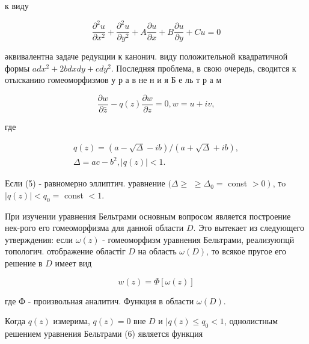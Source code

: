 \documentclass[10pt]{article}
\begin{document}
к виду



\[

\frac{\partial^{2} u}{\partial x^{2}}+\frac{\partial^{2} u}{\partial y^{2}}+A \frac{\partial u}{\partial x}+B \frac{\partial u}{\partial y}+C u=0

\]



әквивалентна задаче редукции к канонич. виду положительной квадратичной формы $a d x^{2}+2 b d x d y+c d y^{2}$. Последняя проблема, в свою очередь, сводится к отысканию гомеоморфизмов у р а в не н и я Б е ль т р а м



\[

\frac{\partial w}{\partial \bar{z}}-q(z) \frac{\partial w}{\partial z}=0, w=u+i v,

\]



где



\[

\begin{gathered}

q(z)=(a-\sqrt{\Delta}-i b) /(a+\sqrt{\Delta}+i b), \\

\Delta=a c-b^{2},|q(z)|<1 .

\end{gathered}

\]



Если (5) - равномерно эллиптич. уравнение $(\Delta \geqslant$ $\geqslant \Delta_{0}=$ const $\left.>0\right)$, тo $|q(z)|<q_{0}=$ const $<1$.



При изучении уравнения Бельтрами основным вопросом является построение нек-рого его гомеоморфизма для данной области $D$. Это вытекает из следующего утверждения: если $\omega(z)$ - гомеоморфизм уравнения Бельтрами, реализуюпцй топологич. отображение областіг $D$ на область $\omega(D)$, то всякое пругое его решение в $D$ имеет вид



\[

w(z)=\Phi[\omega(z)]

\]



где Ф - произвольная аналитич. Функция в области $\omega(D)$.



Когда $q(z)$ измерима, $q(z)=0$ вне $D$ и $\mid q(z) \leqslant q_{0}<1$, однолистным решением уравнения Бельтрами (6) является функция
\end{document}
